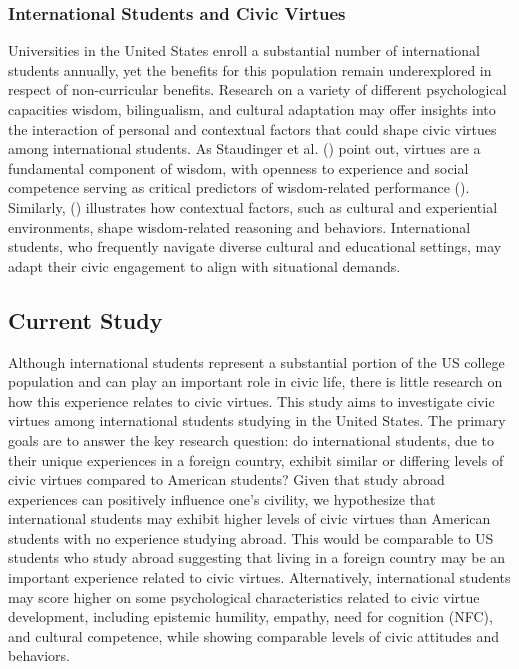 \documentclass[
  man,
  floatsintext,
  longtable,
  nolmodern,
  notxfonts,
  notimes,
  colorlinks=true,linkcolor=blue,citecolor=blue,urlcolor=blue]{apa7}
\begin{document}
\subsubsection{International Students and Civic
Virtues}\label{international-students-and-civic-virtues}

Universities in the United States enroll a substantial number of
international students annually, yet the benefits for this population
remain underexplored in respect of non-curricular benefits. Research on
a variety of different psychological capacities wisdom, bilingualism,
and cultural adaptation may offer insights into the interaction of
personal and contextual factors that could shape civic virtues among
international students. As Staudinger et al.
() point
out, virtues are a fundamental component of wisdom, with openness to
experience and social competence serving as critical predictors of
wisdom-related performance
().
Similarly, ()
illustrates how contextual factors, such as cultural and experiential
environments, shape wisdom-related reasoning and behaviors.
International students, who frequently navigate diverse cultural and
educational settings, may adapt their civic engagement to align with
situational demands.

\subsection{Current Study}\label{current-study}

Although international students represent a substantial portion of the
US college population and can play an important role in civic life,
there is little research on how this experience relates to civic
virtues. This study aims to investigate civic virtues among
international students studying in the United States. The primary goals
are to answer the key research question: do international students, due
to their unique experiences in a foreign country, exhibit similar or
differing levels of civic virtues compared to American students? Given
that study abroad experiences can positively influence one's civility,
we hypothesize that international students may exhibit higher levels of
civic virtues than American students with no experience studying abroad.
This would be comparable to US students who study abroad suggesting that
living in a foreign country may be an important experience related to
civic virtues. Alternatively, international students may score higher on
some psychological characteristics related to civic virtue development,
including epistemic humility, empathy, need for cognition (NFC), and
cultural competence, while showing comparable levels of civic attitudes
and behaviors.
\end{document}
